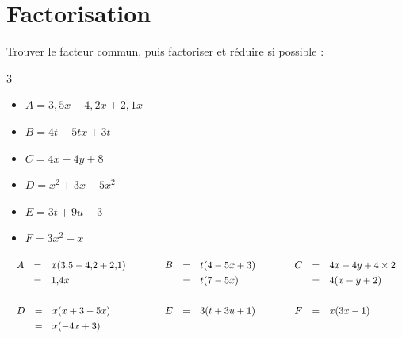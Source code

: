 \section{Factorisation}

\begin{methode}
	Trouver le facteur commun, puis factoriser et réduire si possible :
	\begin{multicols}{3}
		\begin{itemize}
			\item $A = 3{,}5x - 4{,}2x + 2{,}1x$
			\item $B = 4t - 5tx + 3t$
			\item $C = 4x - 4y + 8$
			\item $D = x^2 + 3x - 5x^2$
			\item $E = 3t + 9u + 3$
			\item $F = 3x^2 - x$
		\end{itemize}
	\end{multicols}

	\begin{correction}
		\[
			\begin{array}{lll}%
				\def\arraystretch{1.3}%
				\begin{array}{rcl}%
					A & = & x(3{,}5 - 4{,}2 + 2{,}1) \\
					  & = & 1{,}4x
				\end{array}\quad & \quad %
				\def\arraystretch{1.3}%
				\begin{array}{rcl}%
					B & = & t(4 - 5x + 3) \\
					  & = & t(7 - 5x)
				\end{array}\quad & \quad %
				\def\arraystretch{1.3}%
				\begin{array}{rcl}%
					C & = & 4x - 4y + 4 \times 2 \\
					  & = & 4(x - y + 2)
				\end{array} \\~&~&~\\%
				\def\arraystretch{1.3}%
				\begin{array}{rcl}%
					D & = & x(x + 3 - 5x) \\
					  & = & x(-4x + 3)
				\end{array}\quad & \quad %
				\def\arraystretch{1.3}%
				\begin{array}{rcl}%
					E & = & 3(t + 3u + 1) \\
					  &   &               \\
				\end{array}\quad & \quad %
				\def\arraystretch{1.3}%
				\begin{array}{rcl}%
					F & = & x(3x - 1) \\
					  &   &           \\
				\end{array}%
			\end{array}%
		\]
	\end{correction}
\end{methode}

